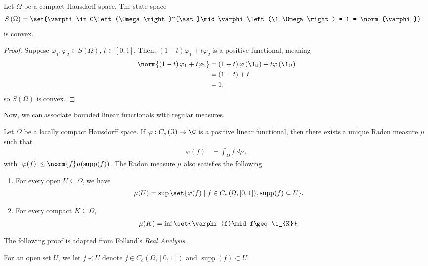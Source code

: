 \documentclass[10pt]{mypackage}
\DeclareMathOperator{\supp}{supp}
\begin{document}
\begin{corollary}
  Let $\Omega$ be a compact Hausdorff space. The state space
  \begin{align*}
    S\left(\Omega\right) &= \set{\varphi\in C\left(\Omega\right)^{\ast}\mid \varphi\left(\1_\Omega\right) = 1 = \norm{\varphi}}
  \end{align*}
  is convex.
\end{corollary}
\begin{proof}
  Suppose $\varphi_1 ,\varphi_2\in S(\Omega)$, $t\in [0,1]$. Then, $\left(1-t\right)\varphi_1 + t\varphi_2$ is a positive functional, meaning
  \begin{align*}
    \norm{\left(1-t\right)\varphi_1 + t\varphi_2} &= \left(1-t\right)\varphi\left(\1_\Omega\right) + t\varphi\left(\1_\Omega\right)\\
    &= \left(1-t\right) + t\\
    &= 1,
  \end{align*}
  so $S(\Omega)$ is convex.
\end{proof}
Now, we can associate bounded linear functionals with regular measures.
\begin{theorem}
  Let $\Omega$ be a locally compact Hausdorff space. If $\varphi: C_c\left(\Omega\right) \rightarrow \C$ is a positive linear functional, then there exists a unique Radon measure $\mu$ such that
  \begin{align*}
    \varphi(f) &= \int_{\Omega}f\:d\mu,
  \end{align*}
  with $\left\vert \varphi(f) \right\vert \leq \norm{f}\mu\!\left(\supp(f)\right)$. The Radon measure $\mu$ also satisfies the following.
  \begin{enumerate}[(1)]
    \item For every open $U\subseteq \Omega$, we have
      \begin{align*}
        \mu\!\left(U\right) &= \sup\set{\varphi(f)\mid f\in C_c\left(\Omega,[0,1]\right),\supp(f)\subseteq U}.
      \end{align*}
    \item For every compact $K\subseteq \Omega$,
      \begin{align*}
        \mu\!\left(K\right) &= \inf\set{\varphi(f)\mid f\geq \1_{K}}.
      \end{align*}
  \end{enumerate}
\end{theorem}
The following proof is adapted from Folland's \textit{Real Analysis}.
\begin{notation}
  For an open set $U$, we let $f\prec U$ denote $f\in C_c\left(\Omega,[0,1]\right)$ and $\supp(f) \subset U$.
\end{notation}
\end{document}
